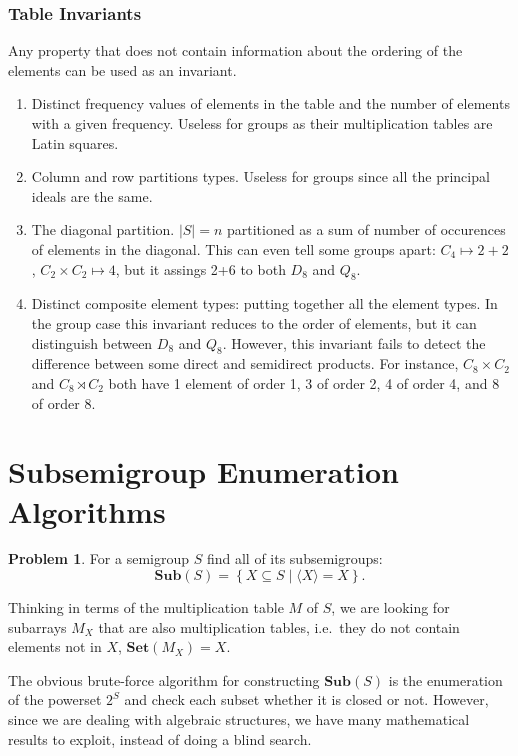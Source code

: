 \documentclass{amsart}
\newcommand{\Sub}{\mathbf{Sub}}
\newcommand{\Set}{\mathbf{Set}}
\theoremstyle{plain}
\theoremstyle{definition}
\newtheorem{problem}[theorem]{Problem}
\begin{document}
\subsubsection{Table Invariants}

Any property that does not contain information about the ordering of the elements can be used as an invariant.
\begin{enumerate}
\item Distinct frequency values of elements in the table and the number of elements with a given frequency. Useless for groups as their multiplication tables are Latin squares.
\item Column and row partitions types.   Useless for groups since all the principal ideals are the same.
\item The diagonal partition. $|S|=n$ partitioned as a sum of number of occurences of elements in the diagonal. This can even tell some groups apart: $C_4\mapsto 2+2$, $C_2\times C_2\mapsto 4$, but it assings 2+6 to both $D_8$ and $Q_8$.
\item Distinct composite element types: putting together all the element types. In the group case this invariant reduces to the order of elements, but it can distinguish between $D_8$ and $Q_8$. However, this invariant fails to detect the difference between some direct and semidirect products. For instance, $C_8\times C_2$ and $C_8\rtimes C_2$ both have 1 element of order 1, 3 of order 2, 4 of order 4, and 8 of order 8.
\end{enumerate} 



\section{Subsemigroup Enumeration Algorithms}
\label{sec:enum}


\begin{problem}
For a semigroup $S$ find all of its subsemigroups:
$$\Sub(S)=\left\{ X\subseteq S\mid \langle X\rangle=X\right\}.$$
\end{problem}
Thinking in terms of the multiplication table $M$ of $S$, we are looking for subarrays $M_X$ that are also multiplication tables, i.e.\ they do not contain elements not in $X$, $\Set(M_X)=X$.

The obvious brute-force algorithm for constructing $\Sub(S)$ is the enumeration of the powerset $2^S$ and check each subset whether it is closed or not.
However, since we are dealing with algebraic structures, we have many mathematical results to exploit, instead of doing a blind search.
\end{document}
